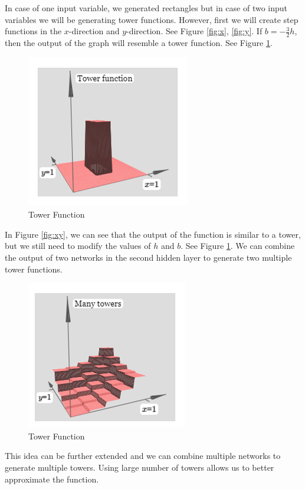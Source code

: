 \documentclass{article}
\begin{document}
In case of one input variable, we generated rectangles but in case of two input variables we will be generating tower functions. However, first we will create step functions in the $x$-direction and $y$-direction. See Figure \ref{fig:x}, \ref{fig:y}. 
\newpage
If $ b = -\frac{3}{2}h$, then the output of the graph will resemble a tower function. See Figure \ref{fig:figure16}.
\begin{figure}[h!]
    \centering
    \includegraphics[width=0.5 \textwidth]{Images/2/17.png}
    \caption{Tower Function}
    \label{fig:figure16}
\end{figure}
In Figure \ref{fig:xy}, we can see that the output of the function is similar to a tower, but we still need to modify the values of $h$ and $b$. See Figure \ref{fig:figure16}. 
We can combine the output of two networks in the second hidden layer to generate two multiple tower functions. 
\begin{figure}[h!]
    \centering
    \includegraphics[width=0.5 \textwidth]{Images/2/18.png}
    \caption{Tower Function}
    \label{fig:figure17}
\end{figure}
This idea can be further extended and we can combine multiple networks to generate multiple towers. Using large number of towers allows us to better approximate the function.
\end{document}
